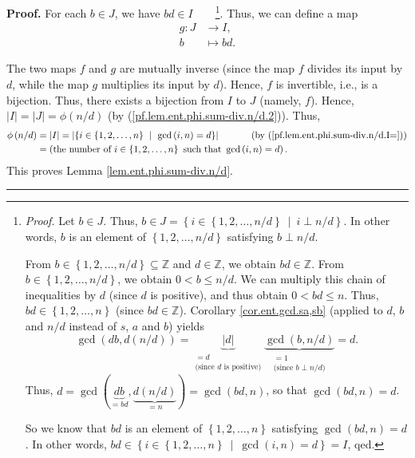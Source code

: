 \documentclass[numbers=enddot,12pt,final,onecolumn,notitlepage]{scrartcl}%
\numberwithin{exer}{subsection}
\theoremstyle{definition}
\newenvironment{proof}[1][Proof]{\noindent\textbf{#1.} }{\ \rule{0.5em}{0.5em}}
\begin{document}
\begin{proof}
For each $b\in J$, we have $bd\in I$\ \ \ \ \footnote{\textit{Proof.} Let
$b\in J$. Thus, $b\in J=\left\{  i\in\left\{  1,2,\ldots,n/d\right\}
\ \mid\ i\perp n/d\right\}  $. In other words, $b$ is an element of $\left\{
1,2,\ldots,n/d\right\}  $ satisfying $b\perp n/d$.
\par
From $b\in\left\{  1,2,\ldots,n/d\right\}  \subseteq\mathbb{Z}$ and
$d\in\mathbb{Z}$, we obtain $bd\in\mathbb{Z}$. From $b\in\left\{
1,2,\ldots,n/d\right\}  $, we obtain $0<b\leq n/d$. We can multiply this chain
of inequalities by $d$ (since $d$ is positive), and thus obtain $0<bd\leq n$.
Thus, $bd\in\left\{  1,2,\ldots,n\right\}  $ (since $bd\in\mathbb{Z}$).
Corollary \ref{cor.ent.gcd.sa,sb} (applied to $d$, $b$ and $n/d$ instead of
$s$, $a$ and $b$) yields%
\[
\gcd\left(  db,d\left(  n/d\right)  \right)  =\underbrace{\left\vert
d\right\vert }_{\substack{=d\\\text{(since }d\text{ is positive)}%
}}\underbrace{\gcd\left(  b,n/d\right)  }_{\substack{=1\\\text{(since }b\perp
n/d\text{)}}}=d.
\]
Thus, $d=\gcd\left(  \underbrace{db}_{=bd},\underbrace{d\left(  n/d\right)
}_{=n}\right)  =\gcd\left(  bd,n\right)  $, so that $\gcd\left(  bd,n\right)
=d$.
\par
So we know that $bd$ is an element of $\left\{  1,2,\ldots,n\right\}  $
satisfying $\gcd\left(  bd,n\right)  =d$. In other words, $bd\in\left\{
i\in\left\{  1,2,\ldots,n\right\}  \ \mid\ \gcd\left(  i,n\right)  =d\right\}
=I$, qed.}. Thus, we can define a map%
\begin{align*}
g:J  &  \rightarrow I,\\
b  &  \mapsto bd.
\end{align*}


The two maps $f$ and $g$ are mutually inverse (since the map $f$ divides its
input by $d$, while the map $g$ multiplies its input by $d$). Hence, $f$ is
invertible, i.e., is a bijection. Thus, there exists a bijection from $I$ to
$J$ (namely, $f$). Hence, $\left\vert I\right\vert =\left\vert J\right\vert
=\phi\left(  n/d\right)  $ (by (\ref{pf.lem.ent.phi.sum-div.n/d.2})). Thus,%
\begin{align*}
\phi\left(  n/d\right)   &  =\left\vert I\right\vert =\left\vert \left\{
i\in\left\{  1,2,\ldots,n\right\}  \ \mid\ \gcd\left(  i,n\right)  =d\right\}
\right\vert \ \ \ \ \ \ \ \ \ \ \left(  \text{by
(\ref{pf.lem.ent.phi.sum-div.n/d.I=})}\right) \\
&  =\left(  \text{the number of }i\in\left\{  1,2,\ldots,n\right\}  \text{
such that }\gcd\left(  i,n\right)  =d\right)  .
\end{align*}
This proves Lemma \ref{lem.ent.phi.sum-div.n/d}.
\end{proof}
\end{document}
